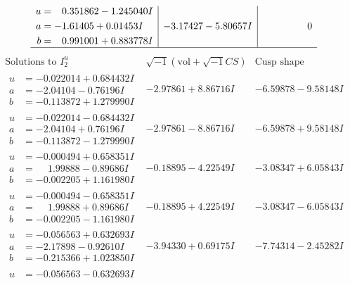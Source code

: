 \documentclass[1p]{elsarticle_modified}
\theoremstyle{definition}
\newcommand{\I}{\sqrt{-1}}
\begin{document}
$$\begin{array}{c|c|c}
\begin{aligned}
u &= \phantom{-}0.351862 - 1.245040 I \\
a &= -1.61405 + 0.01453 I \\
b &= \phantom{-}0.991001 + 0.883778 I\end{aligned}
 & -3.17427 - 5.80657 I & \phantom{-0.000000 } 0\\
 \hline 
 \end{array}$$\newpage$$\begin{array}{c|c|c}  
\text{Solutions to }I^u_{2}& \I (\text{vol} + \sqrt{-1}CS) & \text{Cusp shape}\\
 \hline 
\begin{aligned}
u &= -0.022014 + 0.684432 I \\
a &= -2.04104 - 0.76196 I \\
b &= -0.113872 + 1.279990 I\end{aligned}
 & -2.97861 + 8.86716 I & -6.59878 - 9.58148 I \\ \hline\begin{aligned}
u &= -0.022014 - 0.684432 I \\
a &= -2.04104 + 0.76196 I \\
b &= -0.113872 - 1.279990 I\end{aligned}
 & -2.97861 - 8.86716 I & -6.59878 + 9.58148 I \\ \hline\begin{aligned}
u &= -0.000494 + 0.658351 I \\
a &= \phantom{-}1.99888 - 0.89686 I \\
b &= -0.002205 + 1.161980 I\end{aligned}
 & -0.18895 - 4.22549 I & -3.08347 + 6.05843 I \\ \hline\begin{aligned}
u &= -0.000494 - 0.658351 I \\
a &= \phantom{-}1.99888 + 0.89686 I \\
b &= -0.002205 - 1.161980 I\end{aligned}
 & -0.18895 + 4.22549 I & -3.08347 - 6.05843 I \\ \hline\begin{aligned}
u &= -0.056563 + 0.632693 I \\
a &= -2.17898 - 0.92610 I \\
b &= -0.215366 + 1.023850 I\end{aligned}
 & -3.94330 + 0.69175 I & -7.74314 - 2.45282 I \\ \hline\begin{aligned}
u &= -0.056563 - 0.632693 I \\

\end{aligned}
\end{array}$$
\end{document}
